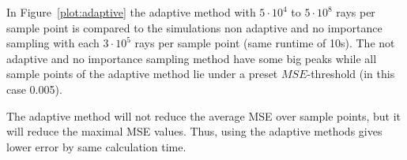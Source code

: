 
In Figure~\ref{plot:adaptive} the adaptive method with 
$5 \cdot 10^4$ to $5 \cdot 10^8$ rays per sample point is compared to the simulations
non adaptive and no importance sampling with each $3 \cdot 10^5$ rays per sample point (same runtime of 10s).
The not adaptive and no importance sampling method have some big peaks while all sample points of 
the adaptive method lie under a preset $MSE$-threshold (in this case 0.005). 

The adaptive method will not reduce the average MSE over sample points,
but it will reduce the maximal MSE values. Thus, using the adaptive
methods gives lower error by same calculation time.



